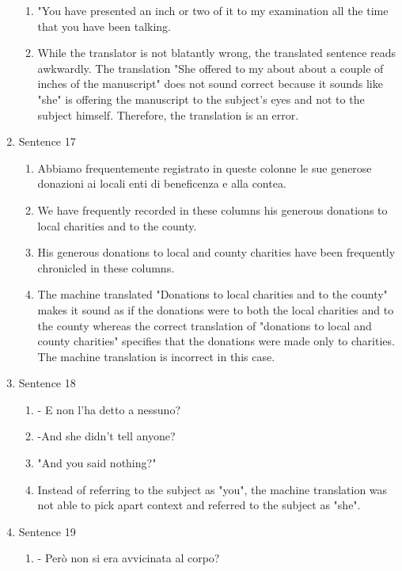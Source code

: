 \documentclass{article}
\begin{document}
\begin{enumerate}
\begin{enumerate}[label=(\alph*)]
        \item "You have presented an inch or two of it to my examination all the time that you have been talking.
        \item While the translator is not blatantly wrong, the translated sentence reads awkwardly. The translation "She 
            offered to my about about a couple of inches of the manuscript" does not sound correct because 
            it sounds like "she" is offering the manuscript to the subject's eyes and not to the subject himself. Therefore,
             the translation is an error.
    \end{enumerate}   
    \item Sentence 17
    \begin{enumerate}[label=(\alph*)]
        \item Abbiamo frequentemente registrato in queste colonne le sue generose donazioni ai locali enti di beneficenza e alla contea.
        \item We have frequently recorded in these columns his generous donations to local charities and to the county.
        \item His generous donations to local and county charities have been frequently chronicled in these columns.
        \item The machine translated "Donations to local charities and to the county" makes it sound as if the donations were to both the 
            local charities and to the county whereas the correct translation of "donations to local and county charities" specifies that the 
            donations were made only to charities. The machine translation is incorrect in this case.
    \end{enumerate}   
    \item Sentence 18
    \begin{enumerate}[label=(\alph*)]
        \item    - E non l’ha detto a nessuno?
        \item -And she didn't tell anyone?
        \item "And you said nothing?"
        \item Instead of referring to the subject as "you", the machine translation was not able to pick apart context and 
            referred to the subject as "she". 
    \end{enumerate}   
    \item Sentence 19
    \begin{enumerate}[label=(\alph*)]
        \item     - Però non si era avvicinata al corpo?

\end{enumerate}
\end{enumerate}
\end{document}
